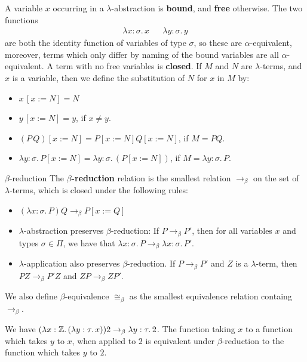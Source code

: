 \documentclass{article}
\numberwithin{thm}{subsection}
\begin{document}
A variable $x$ occurring in a $\lambda$-abstraction is \textbf{bound}, and \textbf{free} otherwise. The two functions \begin{align*}
     \lambda x: \sigma. \, x & &  \lambda y: \sigma. \, y
\end{align*}
are both the identity function of variables of type $\sigma$, so these are $\alpha$-equivalent, moreover, terms which only differ by naming of the bound variables are all $\alpha$-equivalent.\gap 
A term with no free variables is \textbf{closed}.\gap
If $M$ and $N$ are $\lambda$-terms, and $x$ is a variable, then we define the substitution of $N$ for $x$ in $M$ by: \begin{itemize}
    \item $x\, [x:=N] = N$
    \item $y\, [x:=N] = y$, if $x \neq y$.
    \item $(P\, Q)[x:=N] = P[x:= N] Q[x:=N]$, if $M=PQ$. 
    \item $\lambda y: \sigma. \, P [x:=N] = \lambda y: \sigma. \, (P[x:=N])$, if $M= \lambda y: \sigma. \, P$.
\end{itemize}
\begin{fancydefine}{$\beta$-reduction}
    The $\beta$\textbf{-reduction} relation is the smallest relation $\to_{\beta}$ on the set of $\lambda$-terms, which is closed under the following rules: \begin{itemize}
        \item $(\lambda x: \sigma. \, P)Q \to_{\beta} P[x:=Q]$
        \item $\lambda$-abstraction preserves $\beta$-reduction: \gap If $P \to_{\beta}P'$, then for all variables $x$ and types $\sigma \in \Pi$, we have that $\lambda x: \sigma. \, P \to_{\beta} \lambda x: \sigma. \, P'$.
        \item $\lambda$-application also preserves $\beta$-reduction. If $P \to_{\beta} P'$ and $Z$ is a $\lambda$-term, then $PZ \to_{\beta} P'Z$ and $ZP \to_{\beta} ZP'$.
    \end{itemize} 
    We also define $\beta$-equivalence $\cong_{\beta}$ as the smallest equivalence relation containg $\to_{\beta}$.
\end{fancydefine}
\begin{ex}
    We have $(\lambda x : \mathbb{Z}. \, (\lambda y : \tau. \, x)) 2 \to_{\beta} \lambda y: \tau.\, 2$. The function taking $x$ to a function which takes $y$ to $x$, when applied to $2$ is equivalent under $\beta$-reduction to the function which takes $y$ to $2$.
\end{ex}
\end{document}
